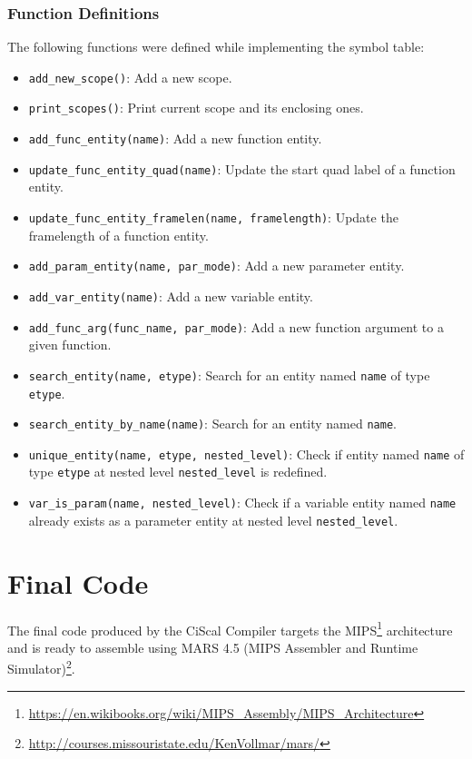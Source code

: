 \documentclass{article}
\def\code#1{\texttt{#1}} %
\begin{document}
\subsubsection{Function Definitions}
The following functions were defined while implementing the symbol table:
\begin{itemize}
 \item \code{add\_new\_scope()}: Add a new scope.
 \item \code{print\_scopes()}: Print current scope and its enclosing ones.
 \item \code{add\_func\_entity(name)}: Add a new function entity.
 \item \code{update\_func\_entity\_quad(name)}: Update the start quad label of a function entity.
 \item \code{update\_func\_entity\_framelen(name, framelength)}: Update the framelength of a function entity.
 \item \code{add\_param\_entity(name, par\_mode)}: Add a new parameter entity.
 \item \code{add\_var\_entity(name)}: Add a new variable entity.
 \item \code{add\_func\_arg(func\_name, par\_mode)}: Add a new function argument to a given function.
 \item \code{search\_entity(name, etype)}: Search for an entity named \code{name} of type \code{etype}.
 \item \code{search\_entity\_by\_name(name)}: Search for an entity named \code{name}.
 \item \code{unique\_entity(name, etype, nested\_level)}: Check if entity named \code{name} of type \code{etype}
                                                        at nested level \code{nested\_level} is redefined.
 \item \code{var\_is\_param(name, nested\_level)}: Check if a variable entity named \code{name} already 
                                                   exists as a parameter entity at nested level \code{nested\_level}.
\end{itemize}

\newpage


\section{Final Code}
The final code produced by the CiScal Compiler targets the MIPS\footnote{\url{https://en.wikibooks.org/wiki/MIPS_Assembly/MIPS_Architecture}} architecture and
is ready to assemble using MARS 4.5 (MIPS Assembler and Runtime 
Simulator)\footnote{\url{http://courses.missouristate.edu/KenVollmar/mars/}}.
\end{document}
